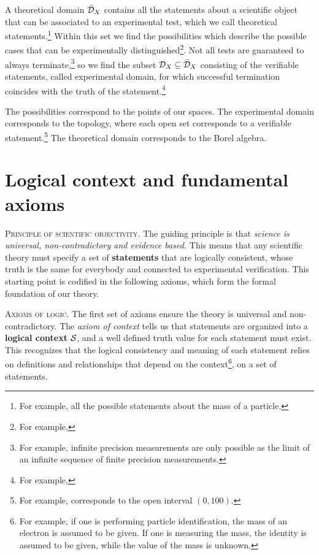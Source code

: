 \documentclass[10pt,twocolumn, nofootinbib]{revtex4-1}
\newcommand\partitle[1]{\textsc{#1}.}
\begin{document}
A theoretical domain $\bar{\mathcal{D}}_X$ contains all the statements about a scientific object that can be associated to an experimental test, which we call theoretical statements.\footnote{For example, all the possible statements about the mass of a particle.} Within this set we find the possibilities which describe the possible cases that can be experimentally distinguished\footnote{For example, }. Not all tests are guaranteed to always terminate,\footnote{For example, infinite precision measurements are only possible as the limit of an infinite sequence of finite precision measurements.} so we find the subset $\mathcal{D}_X \subseteq \bar{\mathcal{D}}_X$ consisting of the verifiable statements, called experimental domain, for which successful termination coincides with the truth of the statement.\footnote{For example, }

The possibilities correspond to the points of our spaces. The experimental domain corresponds to the topology, where each open set corresponds to a verifiable statement.\footnote{For example,  corresponds to the open interval $(0, 100)$.} The theoretical domain corresponds to the Borel algebra.


\section{Logical context and fundamental axioms}

\partitle{Principle of scientific objectivity} The guiding principle is that \emph{science is universal, non-contradictory and evidence based.} This means that any scientific theory must specify a set of \textbf{statements} that are logically consistent, whose truth is the same for everybody and connected to experimental verification. This starting point is codified in the following axioms, which form the formal foundation of our theory.

\partitle{Axioms of logic} The first set of axioms ensure the theory is universal and non-contradictory. The \emph{axiom of context} tells us that statements are organized into a \textbf{logical context} $\mathcal{S}$, and a well defined truth value for each statement must exist. This recognizes that the logical consistency and meaning of each statement relies on definitions and relationships that depend on the context\footnote{For example, if one is performing particle identification, the mass of an electron is assumed to be given. If one is measuring the mass, the identity is assumed to be given, while the value of the mass is unknown.}, on a set of statements.
\end{document}
